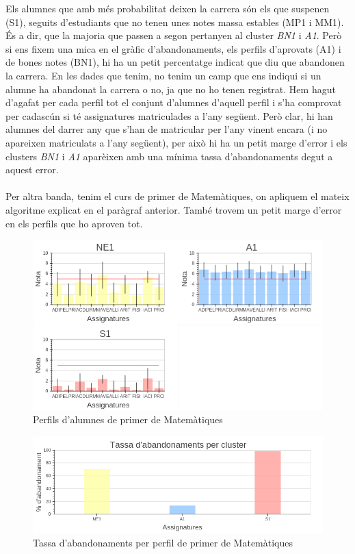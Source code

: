 \documentclass[12pt,a4paper,catalan]{article}
\begin{document}
Els alumnes que amb més probabilitat deixen la carrera són els que suspenen (S1), seguits d'estudiants que no tenen unes notes massa estables (MP1 i MM1). És a dir, que la majoria que passen a segon pertanyen al cluster \textit{BN1} i \textit{A1}. Però si ens fixem una mica en el gràfic d'abandonaments, els perfils d'aprovats (A1) i de bones notes (BN1), hi ha un petit percentatge indicat que diu que abandonen la carrera. En les dades que tenim, no tenim un camp que ens indiqui si un alumne ha abandonat la carrera o no, ja que no ho tenen registrat. Hem hagut d'agafat per cada perfil tot el conjunt d'alumnes d'aquell perfil i s'ha comprovat per cadascún si té assignatures matriculades a l'any següent. Però clar, hi han alumnes del darrer any que s'han de matricular per l'any vinent encara (i no apareixen matriculats a l'any següent), per això hi ha un petit marge d'error i els clusters \textit{BN1} i \textit{A1} aparèixen amb una mínima tassa d'abandonaments degut a aquest error.
\\
\\
Per altra banda, tenim el curs de primer de Matemàtiques, on apliquem el mateix algoritme explicat en el paràgraf anterior. També trovem un petit marge d'error en els perfils que ho aproven tot.

\begin{figure}[h]
\centering
\includegraphics[width=0.9\linewidth]{img/perfils_primer_mates.png}
\caption{Perfils d'alumnes de primer de Matemàtiques}
\end{figure}

\begin{figure}[h]
\centering
\includegraphics[width=.9\linewidth]{img/abandonaments_primer_mates.png}
\caption{Tassa d'abandonaments per perfil de primer de Matemàtiques}
\label{fig:tappm}
\end{figure}
\end{document}
